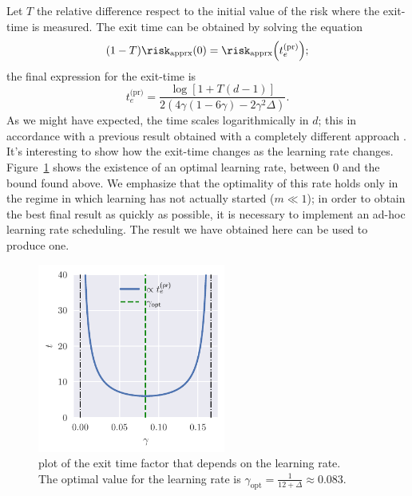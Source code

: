 Let \(T\) the relative difference respect to the initial value of the risk where the exit-time is measured.
The exit time can be obtained by solving the equation
\[
  (1-T)\risk_\text{apprx}{(0)} = \risk_\text{apprx}{\left(t^\text{(pr)}_e\right)};
\]
the final expression for the exit-time is
\[
  t^\text{(pr)}_e = \frac{\log\left[1+T(d-1)\right]}{2\left(4\gamma(1-6\gamma)-2\gamma^2\Delta\right)}.
\]
As we might have expected, the time scales logarithmically in \(d\); this in accordance with a previous result obtained 
with a completely different approach \cite{arous2021online}.
It's interesting to show how the exit-time changes as the learning rate changes.
Figure~\ref{fig:time_learnignrate_plot} shows the existence of an optimal learning rate, between 0 and the bound found above.
We emphasize that the optimality of this rate holds only in the regime in which learning has not actually started (\(m\ll1\));
in order to obtain the best final result as quickly as possible, it is necessary to implement an ad-hoc learning rate scheduling.
The result we have obtained here can be used to produce one.
\begin{figure}
  \centering
  \includegraphics[width=0.55\textwidth]{figures/spherical/gamma_te-factor.pdf}
  \caption{
    plot of the exit time factor that depends on the learning rate.\\
    The optimal value for the learning rate is \(\gamma_\text{opt} = \frac{1}{12+\Delta} \approx \num{0.083}.\)
  }
  \label{fig:time_learnignrate_plot}
\end{figure}

